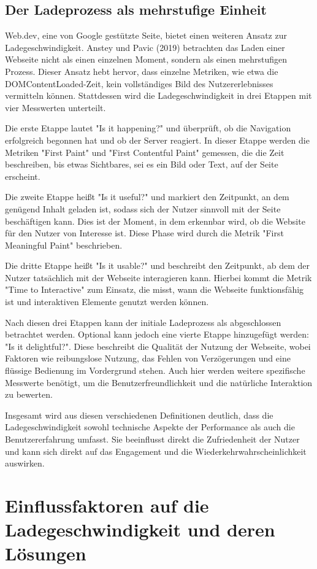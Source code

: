 \subsection{Der Ladeprozess als mehrstufige Einheit}
\label{sec:der_ladeprozess_als_mehrstufige_einheit}
Web.dev, eine von Google gestützte Seite, bietet einen weiteren Ansatz zur Ladegeschwindigkeit. Anstey und Pavic (2019) betrachten das Laden einer Webseite nicht als einen einzelnen Moment, sondern als einen mehrstufigen Prozess. Dieser Ansatz hebt hervor, dass einzelne Metriken, wie etwa die DOMContentLoaded-Zeit, kein vollständiges Bild des Nutzererlebnisses vermitteln können. Stattdessen wird die Ladegeschwindigkeit in drei Etappen mit vier Messwerten unterteilt.

Die erste Etappe lautet "Is it happening?" und überprüft, ob die Navigation erfolgreich begonnen hat und ob der Server reagiert. In dieser Etappe werden die Metriken "First Paint" und "First Contentful Paint" gemessen, die die Zeit beschreiben, bis etwas Sichtbares, sei es ein Bild oder Text, auf der Seite erscheint.

Die zweite Etappe heißt "Is it useful?" und markiert den Zeitpunkt, an dem genügend Inhalt geladen ist, sodass sich der Nutzer sinnvoll mit der Seite beschäftigen kann. Dies ist der Moment, in dem erkennbar wird, ob die Website für den Nutzer von Interesse ist. Diese Phase wird durch die Metrik "First Meaningful Paint" beschrieben.

Die dritte Etappe heißt "Is it usable?" und beschreibt den Zeitpunkt, ab dem der Nutzer tatsächlich mit der Webseite interagieren kann. Hierbei kommt die Metrik "Time to Interactive" zum Einsatz, die misst, wann die Webseite  funktionsfähig ist und  interaktiven Elemente genutzt werden können.

Nach diesen drei Etappen kann der initiale Ladeprozess als abgeschlossen betrachtet werden. Optional kann jedoch eine vierte Etappe hinzugefügt werden: "Is it delightful?". Diese beschreibt die Qualität der Nutzung der Webseite, wobei Faktoren wie reibungslose Nutzung, das Fehlen von Verzögerungen und eine flüssige Bedienung im Vordergrund stehen. Auch hier werden weitere spezifische Messwerte benötigt, um die Benutzerfreundlichkeit und die natürliche Interaktion zu bewerten.

Insgesamt wird aus diesen verschiedenen Definitionen deutlich, dass die Ladegeschwindigkeit sowohl technische Aspekte der Performance als auch die Benutzererfahrung umfasst. Sie beeinflusst direkt die Zufriedenheit der Nutzer und kann sich direkt auf das Engagement und die Wiederkehrwahrscheinlichkeit auswirken.




\section{Einflussfaktoren auf die Ladegeschwindigkeit und deren Lösungen}
\label{sec:einflussfaktoren_auf_die_ladegeschwindigkeit_und_deren_lösungen}


